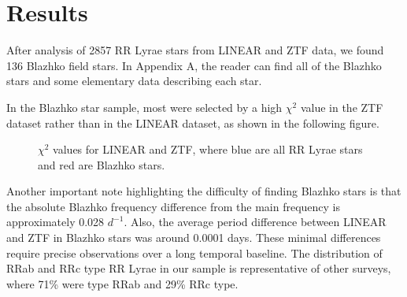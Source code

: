 
\section{Results}\label{sec:results}
After analysis of 2857 RR Lyrae stars from LINEAR and ZTF data, we found 136 Blazhko field stars. In Appendix A, the reader can find all of the Blazhko stars and some elementary data describing each star. 

In the Blazhko star sample, most were selected by a high $\chi^2$ value in the ZTF dataset rather than in the LINEAR dataset, as shown in the following figure.

\begin{figure}
\caption{$\chi^2$ values for LINEAR and ZTF, where blue are all RR Lyrae stars and red are Blazhko stars.}
\label{fig:chi2}
\end{figure}

Another important note highlighting the difficulty of finding Blazhko stars is that the absolute Blazhko frequency difference from the main frequency is approximately 0.028 $d^{-1}$. Also, the average period difference between LINEAR and ZTF in Blazhko stars was around 0.0001 days. These minimal differences require precise observations over a long temporal baseline. The distribution of RRab and RRc type RR Lyrae in our sample is representative of other surveys, where 71\% were type RRab and 29\% RRc type.

